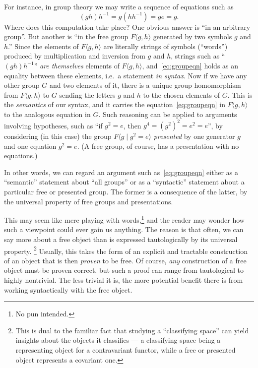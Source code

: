 \documentclass[12pt]{article}
\numberwithin{equation}{section}
\begin{document}
For instance, in group theory we may write a sequence of equations such as
\begin{equation}
  (g h) h^{-1} = g (h h^{-1}) = g e = g.\label{eq:groupeqn}
\end{equation}
Where does this computation take place?
One obvious answer is ``in an arbitrary group''.
But another is ``in the free group $F\langle g,h\rangle$ generated by two symbols $g$ and $h$.''
Since the elements of $F\langle g,h\rangle$ are literally strings of symbols (``words'') produced by multiplication and inversion from $g$ and $h$, strings such as ``$(g h)h^{-1}$'' \emph{are themselves} elements of $F\langle g,h\rangle$, and~\eqref{eq:groupeqn} holds as an equality between these elements, i.e.\ a statement \emph{in syntax}.
Now if we have any other group $G$ and two elements of it, there is a unique group homomorphism from $F\langle g,h\rangle$ to $G$ sending the letters $g$ and $h$ to the chosen elements of $G$.
This is the \emph{semantics} of our syntax, and it carries the equation~\eqref{eq:groupeqn} in $F\langle g,h\rangle$ to the analogous equation in $G$.
Such reasoning can be applied to arguments involving hypotheses, such as ``if $g^2 = e$, then $g^4 = (g^2)^2 = e^2 = e$'', by considering (in this case) the group $F\langle g \mid g^2=e\rangle$ \emph{presented} by one generator $g$ and one equation $g^2=e$.
(A free group, of course, has a presentation with no equations.)

In other words, we can regard an argument such as~\eqref{eq:groupeqn} either as a ``semantic'' statement about ``all groups'' or as a ``syntactic'' statement about a particular free or presented group.
The former is a consequence of the latter, by the universal property of free groups and presentations.

This may seem like mere playing with words,\footnote{No pun intended.} and the reader may wonder how such a viewpoint could ever gain us anything.
The reason is that often, we can say more about a free object than is expressed tautologically by its universal property.%
\footnote{This is dual to the familiar fact that studying a ``classifying space'' can yield insights about the objects it classifies --- a classifying space being a representing object for a contravariant functor, while a free or presented object represents a covariant one.}
Usually, this takes the form of an explicit and tractable construction of an object that is then \emph{proven} to be free.
Of course, \emph{any} construction of a free object must be proven correct, but such a proof can range from tautological to highly nontrivial.
The less trivial it is, the more potential benefit there is from working syntactically with the free object.
\end{document}
